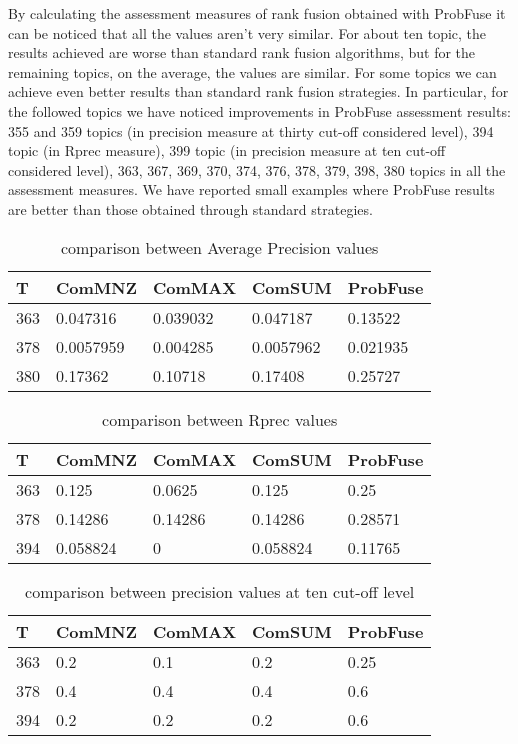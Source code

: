 \documentclass[12pt,journal]{IEEEtran}
\begin{document}
By calculating the assessment measures of rank fusion obtained with ProbFuse it can be noticed that all the values aren’t very similar. For about ten topic, the results achieved are worse than standard rank fusion algorithms, but for the remaining topics, on the average, the values are similar. For some topics we can achieve even better results than standard rank fusion strategies.
In particular, for the followed topics we have noticed improvements in ProbFuse assessment results: 355 and 359 topics (in precision measure at thirty cut-off considered level), 394 topic (in Rprec measure), 399 topic (in precision measure at ten cut-off considered level), 363, 367, 369, 370, 374, 376, 378, 379, 398, 380 topics in all the assessment measures. We have reported small examples where ProbFuse results are better than those obtained through standard strategies.

\begin{table}[h!]
\centering
\caption{comparison between Average Precision values}
\begin{tabular}{|l|l|l|l|l|}
\hline
T   & ComMNZ    & ComMAX   & ComSUM    & ProbFuse \\ \hline
363 & 0.047316  & 0.039032 & 0.047187  & 0.13522  \\ \hline
378 & 0.0057959 & 0.004285 & 0.0057962 & 0.021935 \\ \hline
380 & 0.17362   & 0.10718  & 0.17408   & 0.25727 \\ \hline
\end{tabular}
\end{table}

\begin{table}[h!]
\centering
\caption{comparison between Rprec values}
\begin{tabular}{|l|l|l|l|l|}
\hline
T   & ComMNZ   & ComMAX  & ComSUM   & ProbFuse \\ \hline
363 & 0.125    & 0.0625  & 0.125    & 0.25     \\ \hline
378 & 0.14286  & 0.14286 & 0.14286  & 0.28571  \\ \hline
394 & 0.058824 & 0       & 0.058824 & 0.11765  \\ \hline
\end{tabular}
\end{table}

\begin{table}[h!]
\centering
\caption{comparison between precision values at ten cut-off level}
\begin{tabular}{|l|l|l|l|l|}
\hline
T   & ComMNZ & ComMAX & ComSUM & ProbFuse \\ \hline
363 & 0.2    & 0.1    & 0.2    & 0.25     \\ \hline
378 & 0.4    & 0.4    & 0.4    & 0.6      \\ \hline
394 & 0.2    & 0.2    & 0.2    & 0.6     \\ \hline
\end{tabular}
\end{table}
\end{document}
